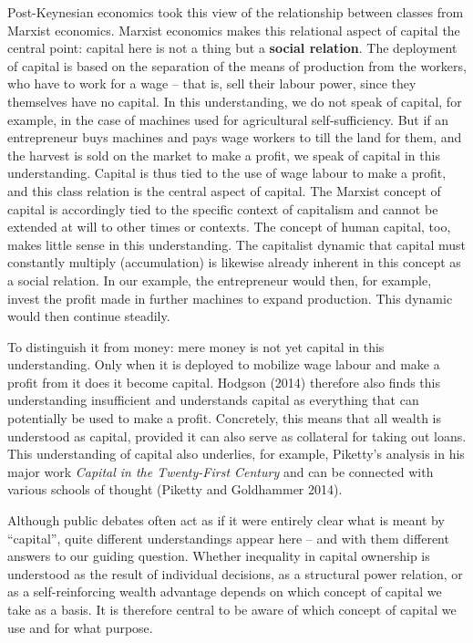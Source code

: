 \documentclass[
  british,
  a4paper,
  DIV=11,
  numbers=noendperiod,
  oneside,
  openany]{scrreprt}
\begin{document}
Post-Keynesian economics took this view of the relationship between
classes from Marxist economics. Marxist economics makes this relational
aspect of capital the central point: capital here is not a thing but a
\textbf{social relation}. The deployment of capital is based on the
separation of the means of production from the workers, who have to work
for a wage -- that is, sell their labour power, since they themselves
have no capital. In this understanding, we do not speak of capital, for
example, in the case of machines used for agricultural self-sufficiency.
But if an entrepreneur buys machines and pays wage workers to till the
land for them, and the harvest is sold on the market to make a profit,
we speak of capital in this understanding. Capital is thus tied to the
use of wage labour to make a profit, and this class relation is the
central aspect of capital. The Marxist concept of capital is accordingly
tied to the specific context of capitalism and cannot be extended at
will to other times or contexts. The concept of human capital, too,
makes little sense in this understanding. The capitalist dynamic that
capital must constantly multiply (accumulation) is likewise already
inherent in this concept as a social relation. In our example, the
entrepreneur would then, for example, invest the profit made in further
machines to expand production. This dynamic would then continue
steadily.

To distinguish it from money: mere money is not yet capital in this
understanding. Only when it is deployed to mobilize wage labour and make
a profit from it does it become capital. Hodgson (2014) therefore also
finds this understanding insufficient and understands capital as
everything that can potentially be used to make a profit. Concretely,
this means that all wealth is understood as capital, provided it can
also serve as collateral for taking out loans. This understanding of
capital also underlies, for example, Piketty's analysis in his major
work \emph{Capital in the Twenty-First Century} and can be connected
with various schools of thought (Piketty and Goldhammer 2014).

Although public debates often act as if it were entirely clear what is
meant by ``capital'', quite different understandings appear here -- and
with them different answers to our guiding question. Whether inequality
in capital ownership is understood as the result of individual
decisions, as a structural power relation, or as a self-reinforcing
wealth advantage depends on which concept of capital we take as a basis.
It is therefore central to be aware of which concept of capital we use
and for what purpose.
\end{document}
